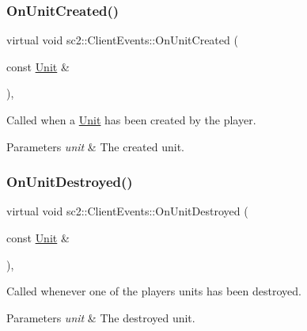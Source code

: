 \subsubsection{\texorpdfstring{On\+Unit\+Created()}{OnUnitCreated()}}
{\footnotesize\ttfamily virtual void sc2\+::\+Client\+Events\+::\+On\+Unit\+Created (\begin{DoxyParamCaption}\item[{const \hyperlink{classsc2_1_1_unit}{Unit} \&}]{ }\end{DoxyParamCaption})\hspace{0.3cm}{\ttfamily [inline]}, {\ttfamily [virtual]}}

Called when a \hyperlink{classsc2_1_1_unit}{Unit} has been created by the player. 
\begin{DoxyParams}{Parameters}
{\em unit} & The created unit. \\
\hline
\end{DoxyParams}
\mbox{\label{classsc2_1_1_client_events_a1e0c8a37df68695cf898aa86fddc5a1a}} 
\subsubsection{\texorpdfstring{On\+Unit\+Destroyed()}{OnUnitDestroyed()}}
{\footnotesize\ttfamily virtual void sc2\+::\+Client\+Events\+::\+On\+Unit\+Destroyed (\begin{DoxyParamCaption}\item[{const \hyperlink{classsc2_1_1_unit}{Unit} \&}]{ }\end{DoxyParamCaption})\hspace{0.3cm}{\ttfamily [inline]}, {\ttfamily [virtual]}}

Called whenever one of the player\textquotesingle{}s units has been destroyed. 
\begin{DoxyParams}{Parameters}
{\em unit} & The destroyed unit. \\
\hline
\end{DoxyParams}
\mbox{\label{classsc2_1_1_client_events_a835228e18d8b4488b0f8e830a39116ce}} 
